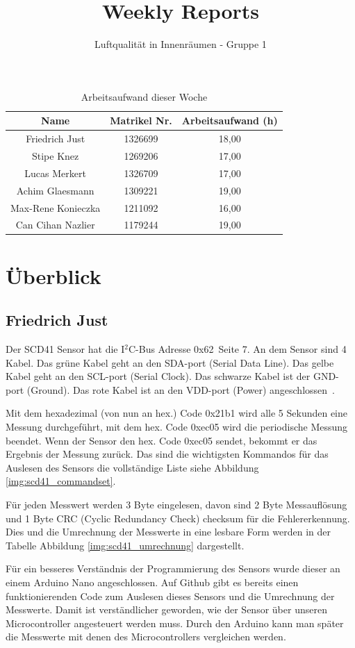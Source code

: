 \documentclass[]{article}
\title{Weekly Reports}
\author{Luftqualität in Innenräumen - Gruppe 1}
\begin{document}
\maketitle

\begin{table}[h!]
	\centering
	\begin{tabular}{|c|c|c|}
		\hline
		{\textbf{Name}}				&		{\textbf{Matrikel Nr.}} & {\textbf{Arbeitsaufwand (h)}} \\
		\hline
		Friedrich Just				&		1326699 				&	18,00	\\
		\hline
		Stipe Knez				&		1269206 				&	17,00	\\
		\hline
		Lucas Merkert				&		1326709					&	17,00	\\
		\hline
		Achim Glaesmann				&		1309221					&	19,00	\\
		\hline
		Max-Rene Konieczka			&		1211092					&	16,00	\\
		\hline
		Can Cihan Nazlier			&		1179244					&	19,00	\\
		\hline
	\end{tabular}
	\caption{Arbeitsaufwand dieser Woche}
	\label{tab:worakload}
\end{table}



\section{Überblick}


\subsection{Friedrich Just}
Der SCD41 Sensor hat die I$^2$C-Bus Adresse 0x62~\cite{datasheetscd41}Seite 7. An dem Sensor sind 4 Kabel. Das grüne Kabel geht an den SDA-port (Serial Data Line). Das gelbe Kabel geht an den SCL-port (Serial Clock). Das schwarze Kabel ist der GND-port (Ground). Das rote Kabel ist an den VDD-port (Power) angeschlossen~\cite{sht21cableconf}.\par Mit dem hexadezimal (von nun an hex.) Code 0x21b1 wird alle 5 Sekunden eine Messung durchgeführt, mit dem hex. Code 0xec05 wird die periodische Messung beendet. Wenn der Sensor den hex. Code 0xec05 sendet, bekommt er das Ergebnis der Messung zurück. Das sind die wichtigsten Kommandos für das Auslesen des Sensors die vollständige Liste siehe {Abbildung \ref{img:scd41_commandset}}.\par Für jeden Messwert werden 3 Byte eingelesen, davon sind 2 Byte Messauflösung und 1 Byte CRC (Cyclic Redundancy Check) checksum für die Fehlererkennung. Dies und die Umrechnung der Messwerte in eine lesbare Form werden in der Tabelle {Abbildung \ref{img:scd41_umrechnung}} dargestellt.\par Für ein besseres Verständnis der Programmierung des Sensors wurde dieser an einem Arduino Nano angeschlossen. Auf Github gibt es bereits einen funktionierenden Code zum Auslesen dieses Sensors und die Umrechnung der Messwerte. Damit ist verständlicher geworden, wie der Sensor über unseren Microcontroller angesteuert werden muss. Durch den Arduino kann man später die Messwerte mit denen des Microcontrollers vergleichen werden.
\end{document}
